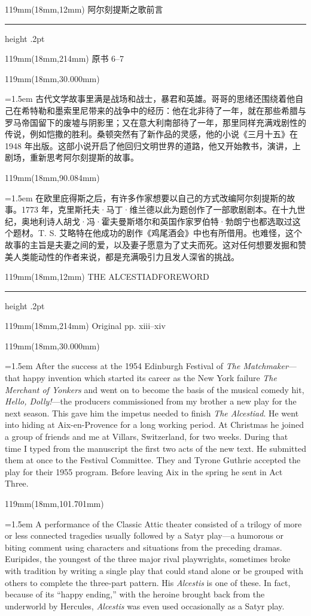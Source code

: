 \documentclass{article}
\newcommand{\ENsetup}{\normalfont\color{ink}\fontsize{11}{16.5}\selectfont\emergencystretch=1.5em}
\newcommand{\ZHsetup}{\normalfont\color{ink}\fontsize{10.5}{17}\selectfont\emergencystretch=1.5em}
\newcommand{\Block}[3]{\begin{textblock*}{119mm}(18mm,#1mm){#2 #3\par}\end{textblock*}}
\newcommand{\Heading}[3]{%
  \begin{textblock*}{119mm}(18mm,12mm)
    \color{quiet}\fontsize{7.5}{10}\selectfont
    #1\hfill #2\par\vspace{3mm}\hrule height .2pt
  \end{textblock*}
  \begin{textblock*}{119mm}(18mm,214mm)
    \color{quiet}\fontsize{7}{10}\selectfont #3\hfill\thepage
  \end{textblock*}
}
\begin{document}
\newpage
\null
\Heading{阿尔刻提斯之歌}{前言}{原书 6–7}
\Block{30.000}{\ZHsetup}{古代文学故事里满是战场和战士，暴君和英雄。哥哥的思绪还围绕着他自己在希特勒和墨索里尼带来的战争中的经历：他在北非待了一年，就在那些希腊与罗马帝国留下的废墟与阴影里；又在意大利南部待了一年，那里同样充满戏剧性的传说，例如恺撒的胜利。桑顿突然有了新作品的灵感，他的小说《三月十五》在 1948 年出版。这部小说开启了他回归文明世界的道路，他又开始教书，演讲，上剧场，重新思考阿尔刻提斯的故事。\par }
\Block{90.084}{\ZHsetup}{在欧里庇得斯之后，有许多作家想要以自己的方式改编阿尔刻提斯的故事。1773 年，克里斯托夫·马丁·维兰德以此为题创作了一部歌剧剧本。在十九世纪，奥地利诗人胡戈·冯·霍夫曼斯塔尔和英国作家罗伯特·勃朗宁也都选取过这个题材。T. S. 艾略特在他成功的剧作《鸡尾酒会》中也有所借用。也难怪，这个故事的主旨是夫妻之间的爱，以及妻子愿意为了丈夫而死。这对任何想要发掘和赞美人类能动性的作者来说，都是充满吸引力且发人深省的挑战。\par }
\newpage
\null
\Heading{THE ALCESTIAD}{FOREWORD}{Original pp. xiii–xiv}
\Block{30.000}{\ENsetup}{After the success at the 1954 Edinburgh Festival of \textit{The Matchmaker}—that happy invention which started its career as the New York failure \textit{The Merchant of Yonkers} and went on to become the basis of the musical comedy hit, \textit{Hello, Dolly!}—the producers commissioned from my brother a new play for the next season. This gave him the impetus needed to finish \textit{The Alcestiad}. He went into hiding at Aix-en-Provence for a long working period. At Christmas he joined a group of friends and me at Villars, Switzerland, for two weeks. During that time I typed from the manuscript the first two acts of the new text. He submitted them at once to the Festival Committee. They and Tyrone Guthrie accepted the play for their 1955 program. Before leaving Aix in the spring he sent in Act Three.\par}
\Block{101.701}{\ENsetup}{A performance of the Classic Attic theater consisted of a trilogy of more or less connected tragedies usually followed by a Satyr play—a humorous or biting comment using characters and situations from the preceding dramas. Euripides, the youngest of the three major rival playwrights, sometimes broke with tradition by writing a single play that could stand alone or be grouped with others to complete the three-part pattern. His \textit{Alcestis} is one of these. In fact, because of its ``happy ending,'' with the heroine brought back from the underworld by Hercules, \textit{Alcestis} was even used occasionally as a Satyr play.\par}
\end{document}
